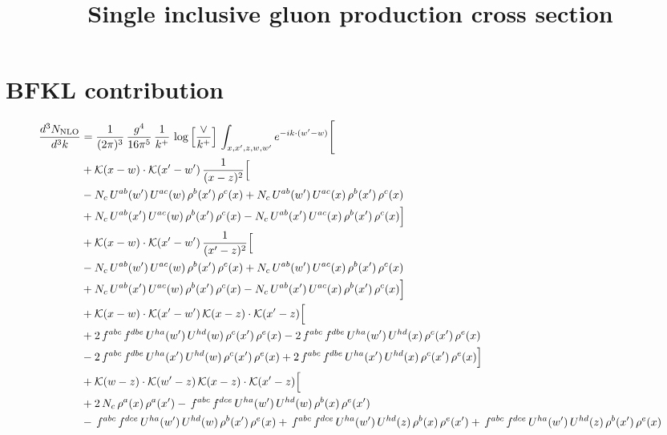 \documentclass[9pt]{article}
\title{Single inclusive gluon production cross section}
\author{}
\date{}
\numberwithin{equation}{section}
\begin{document}
\maketitle
\section{BFKL contribution}
\begin{align}
\frac{d^{3}N_{\mathrm{NLO}}}{d^{3}k} & = \frac{1}{(2\pi)^{3}}\,\frac{g^{4}}{16\pi^{5}}\,\frac{1}{k^{+}}\,\log\Big[\frac{\vee}{k^{+}}\Big]\,\int_{x,x',z,w,w'}e^{-ik\cdot(w'-w)}\Bigg[ \notag\\
& +\mathcal{K}(x-w)\cdot\mathcal{K}(x'-w')\,\frac{1}{(x-z)^{2}}\Big[\notag\\
& -N_{c}\,U^{ab}(w')\,U^{ac}(w)\,\rho^{b}(x')\,\rho^{c}(x) +N_{c}\,U^{ab}(w')\,U^{ac}(x)\,\rho^{b}(x')\,\rho^{c}(x)\notag\\
& +N_{c}\,U^{ab}(x')\,U^{ac}(w)\,\rho^{b}(x')\,\rho^{c}(x) -N_{c}\,U^{ab}(x')\,U^{ac}(x)\,\rho^{b}(x')\,\rho^{c}(x)\Big]\notag\\
& +\mathcal{K}(x-w)\cdot\mathcal{K}(x'-w')\,\frac{1}{(x'-z)^{2}}\Big[\notag\\
& -N_{c}\,U^{ab}(w')\,U^{ac}(w)\,\rho^{b}(x')\,\rho^{c}(x) +N_{c}\,U^{ab}(w')\,U^{ac}(x)\,\rho^{b}(x')\,\rho^{c}(x)\notag\\
& +N_{c}\,U^{ab}(x')\,U^{ac}(w)\,\rho^{b}(x')\,\rho^{c}(x) -N_{c}\,U^{ab}(x')\,U^{ac}(x)\,\rho^{b}(x')\,\rho^{c}(x)\Big]\notag\\
& +\mathcal{K}(x-w)\cdot\mathcal{K}(x'-w')\,\mathcal{K}(x-z)\cdot\mathcal{K}(x'-z)\Big[\notag\\
& +2\,f^{abc}\,f^{dbe}\,U^{ha}(w')\,U^{hd}(w)\,\rho^{c}(x')\,\rho^{e}(x) -2\,f^{abc}\,f^{dbe}\,U^{ha}(w')\,U^{hd}(x)\,\rho^{c}(x')\,\rho^{e}(x)\notag\\
& -2\,f^{abc}\,f^{dbe}\,U^{ha}(x')\,U^{hd}(w)\,\rho^{c}(x')\,\rho^{e}(x) +2\,f^{abc}\,f^{dbe}\,U^{ha}(x')\,U^{hd}(x)\,\rho^{c}(x')\,\rho^{e}(x)\Big]\notag\\
& +\mathcal{K}(w-z)\cdot\mathcal{K}(w'-z)\,\mathcal{K}(x-z)\cdot\mathcal{K}(x'-z)\Big[\notag\\
& +2\,N_{c}\,\rho^{a}(x)\,\rho^{a}(x') -\,f^{abc}\,f^{dce}\,U^{ha}(w')\,U^{hd}(w)\,\rho^{b}(x)\,\rho^{e}(x')\notag\\
& -\,f^{abc}\,f^{dce}\,U^{ha}(w')\,U^{hd}(w)\,\rho^{b}(x')\,\rho^{e}(x) +\,f^{abc}\,f^{dce}\,U^{ha}(w')\,U^{hd}(z)\,\rho^{b}(x)\,\rho^{e}(x') +\,f^{abc}\,f^{dce}\,U^{ha}(w')\,U^{hd}(z)\,\rho^{b}(x')\,\rho^{e}(x)\notag\\

\end{align}
\end{document}
